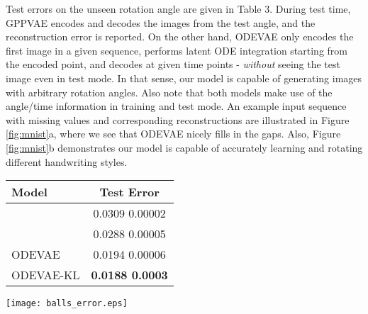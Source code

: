 \documentclass{article}
\newcommand{\0}{\mathbf{0}}
\begin{document}
Test errors on the unseen rotation angle are given in Table 3. 
During test time, GPPVAE encodes and decodes the images from the test angle, and the reconstruction error is reported. On the other hand, ODEVAE only encodes the first image in a given sequence, performs latent ODE integration starting from the encoded point, and decodes at given time points - \textit{without} seeing the test image even in test mode. In that sense, our model is capable of generating images with arbitrary rotation angles. Also note that both models make use of the angle/time information in training and test mode. An example input sequence with missing values and corresponding reconstructions are illustrated in Figure \ref{fig:mnist}a, where we see that ODEVAE nicely fills in the gaps. Also, Figure \ref{fig:mnist}b demonstrates our model is capable of accurately learning and rotating different handwriting styles.\\

\begin{minipage}[b]{\textwidth}
\begin{minipage}[t]{0.46\textwidth}
\centering
	\label{tab:mnist}
	\vskip 0.05in
	\begin{center}
    \begin{small}
    \begin{sc}
	\begin{tabular}{lc}
		\hline
		 Model & Test Error \\ 
	    \hline
		  & 0.0309  0.00002 \\
		  & 0.0288 
0.00005 \\
\textsc{ODEVAE} & 0.0194  0.00006 \\
		 \textsc{ODEVAE-KL} & \textbf{0.0188  0.0003} \\
        \hline
    \end{tabular}
    \end{sc}
    \end{small}
    \end{center}
\end{minipage}
\hfill
\begin{minipage}[t]{0.46\textwidth}
    \centering
    \strut\vspace*{-\baselineskip}\newline
    \texttt{[image: balls\_error.eps]}
    \vspace*{0.25cm}
    \label{fig:balls_error}
\end{minipage}
\end{minipage}
\end{document}

